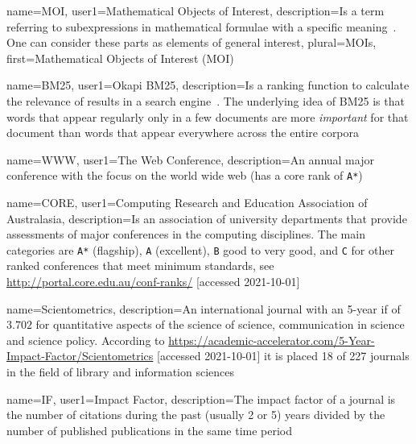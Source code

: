 
{
    name=MOI,
    user1={Mathematical Objects of Interest},
    description={Is a term referring to subexpressions in mathematical formulae with a specific meaning~\cite{GreinerPetterSMB20}. One can consider these parts as elements of general interest},
    plural={MOIs},
    first={Mathematical Objects of Interest (MOI)}
}

{
    name=BM25,
    user1={Okapi BM25},
    description={Is a ranking function to calculate the relevance of results in a search engine~\cite{RobertsonZ09}. The underlying idea of BM25 is that words that appear regularly only in a few documents are more \textit{important} for that document than words that appear everywhere across the entire corpora}
}

{
    name={WWW},
    user1={The Web Conference},
    description={An annual major conference with the focus on the world wide web (has a \gls{core} rank of \texttt{A*})}
}

{
    name={CORE},
    user1={Computing Research and Education Association of Australasia},
    description={Is an association of university departments that provide assessments of major conferences in the computing disciplines. The main categories are \texttt{A*} (flagship), \texttt{A} (excellent), \texttt{B} good to very good, and \texttt{C} for other ranked conferences that meet minimum standards, see \url{http://portal.core.edu.au/conf-ranks/} [accessed 2021-10-01]}
}

{
    name={Scientometrics},
    description={An international journal with an 5-year \gls{if} of $3.702$ for quantitative aspects of the science of science, communication in science and science policy. According to \url{https://academic-accelerator.com/5-Year-Impact-Factor/Scientometrics} [accessed 2021-10-01] it is placed 18 of 227 journals in the field of library and information sciences}
}

{
    name={IF},
    user1={Impact Factor},
    description={The impact factor of a journal is the number of citations during the past (usually 2 or 5) years divided by the number of published publications in the same time period}
}

